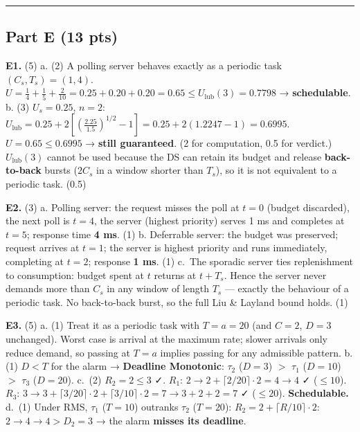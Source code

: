 \documentclass[
  11pt,
]{article}
\begin{document}
\begin{center}\rule{0.5\linewidth}{0.5pt}\end{center}

\subsection{Part E (13 pts)}\label{part-e-13-pts}

\textbf{E1.} (5) a. (2) A polling server behaves exactly as a periodic
task \((C_s, T_s) = (1, 4)\).
\(U = \tfrac14 + \tfrac15 + \tfrac2{10} = 0.25 + 0.20 + 0.20 = 0.65 \le U_{\text{lub}}(3) = 0.7798\)
→ \textbf{schedulable}. b. (3) \(U_s = 0.25\), \(n = 2\):
\(U_{\text{lub}} = 0.25 + 2\left[\left(\tfrac{2.25}{1.5}\right)^{1/2} - 1\right] = 0.25 + 2(1.2247 - 1) = 0.6995\).
\(U = 0.65 \le 0.6995\) → \textbf{still guaranteed}. (2 for computation,
0.5 for verdict.) \(U_{\text{lub}}(3)\) cannot be used because the DS
can retain its budget and release \textbf{back-to-back} bursts (\(2C_s\)
in a window shorter than \(T_s\)), so it is not equivalent to a periodic
task. (0.5)

\textbf{E2.} (3) a. Polling server: the request misses the poll at
\(t=0\) (budget discarded), the next poll is \(t=4\), the server
(highest priority) serves 1 ms and completes at \textbf{\(t = 5\)};
response time \textbf{4 ms}. (1) b. Deferrable server: the budget was
preserved; request arrives at \(t=1\); the server is highest priority
and runs immediately, completing at \textbf{\(t = 2\)}; response
\textbf{1 ms}. (1) c.~The sporadic server ties replenishment to
consumption: budget spent at \(t\) returns at \(t + T_s\). Hence the
server never demands more than \(C_s\) in any window of length \(T_s\)
--- exactly the behaviour of a periodic task. No back-to-back burst, so
the full Liu \& Layland bound holds. (1)

\textbf{E3.} (5) a. (1) Treat it as a periodic task with \(T = a = 20\)
(and \(C=2\), \(D=3\) unchanged). Worst case is arrival at the maximum
rate; slower arrivals only reduce demand, so passing at \(T = a\)
implies passing for any admissible pattern. b. (1) \(D < T\) for the
alarm → \textbf{Deadline Monotonic}: \(\tau_2\) (\(D=3\)) \(>\)
\(\tau_1\) (\(D=10\)) \(>\) \(\tau_3\) (\(D=20\)). c.~(2)
\(R_2 = 2 \le 3\) ✓. \(R_1\):
\(2 \to 2 + \lceil 2/20 \rceil\cdot 2 = 4 \to 4\) ✓ (\(\le 10\)).
\(R_3\):
\(3 \to 3 + \lceil 3/20 \rceil\cdot 2 + \lceil 3/10 \rceil\cdot 2 = 7 \to 3 + 2 + 2 = 7\)
✓ (\(\le 20\)). \textbf{Schedulable.} d.~(1) Under RMS, \(\tau_1\)
(\(T=10\)) outranks \(\tau_2\) (\(T=20\)):
\(R_2 = 2 + \lceil R/10 \rceil \cdot 2\): \(2 \to 4 \to 4 > D_2 = 3\) →
the alarm \textbf{misses its deadline}.
\end{document}
